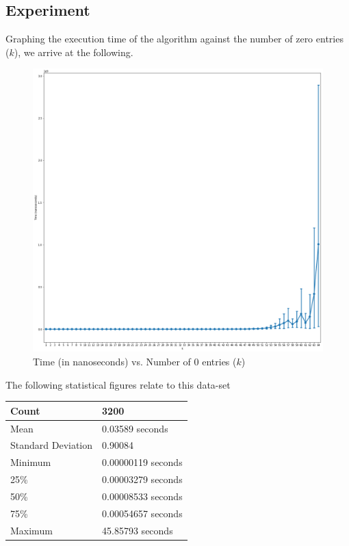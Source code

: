 \documentclass[a4paper]{article}
\begin{document}
\newpage
\subsection{Experiment}
Graphing the execution time of the algorithm against the number of zero entries ($k$), we arrive at the following.
\begin{figure}[H]
    \centering
    \includegraphics[scale=0.3]{experiment1.png}
    \caption{Time (in nanoseconds) vs. Number of 0 entries ($k$)}
    \label{fig:experiment1}
\end{figure}
The following statistical figures relate to this data-set
\begin{table}[H]
    \centering
    \begin{tabular}{|l|l|}
        \hline
        Count                   & 3200                  \\ \hline
        Mean                    &  0.03589 seconds      \\ \hline
        Standard Deviation      &  0.90084              \\ \hline
        Minimum                 &  0.00000119 seconds  \\ \hline
        25\%                    &  0.00003279 seconds  \\ \hline
        50\%                    &  0.00008533 seconds  \\ \hline
        75\%                    &  0.00054657 seconds  \\ \hline
        Maximum                 &  45.85793 seconds     \\ \hline
    \end{tabular}
\end{table}
\end{document}
